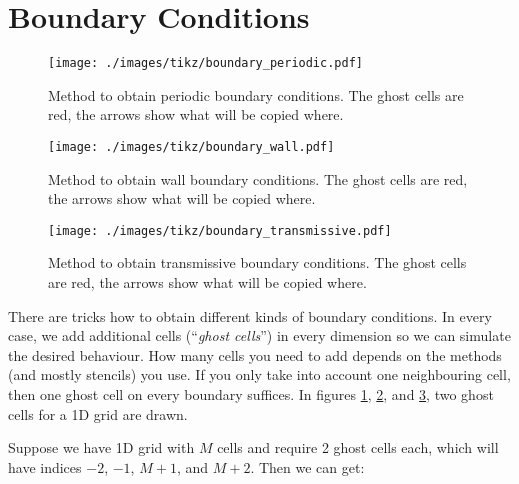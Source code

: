 \newpage
\section{Boundary Conditions}



\begin{figure}[htbp]
	\texttt{[image: ./images/tikz/boundary\_periodic.pdf]}%
	\caption{\label{fig:boundary_periodic}
		Method to obtain periodic boundary conditions.
		The ghost cells are red, the arrows show what will be copied where.
	}
\end{figure}



\begin{figure}[htbp]
	\texttt{[image: ./images/tikz/boundary\_wall.pdf]}%
	\caption{\label{fig:boundary_wall}
		Method to obtain wall boundary conditions.
		The ghost cells are red, the arrows show what will be copied where.
	}
\end{figure}



\begin{figure}[htbp]
	\texttt{[image: ./images/tikz/boundary\_transmissive.pdf]}%
	\caption{\label{fig:boundary_transmissive}
		Method to obtain transmissive boundary conditions.
		The ghost cells are red, the arrows show what will be copied where.
	}
\end{figure}



There are tricks how to obtain different kinds of boundary conditions.
In every case, we add additional cells (``\emph{ghost cells}'') in every dimension so we can simulate the desired behaviour.
How many cells you need to add depends on the methods (and mostly stencils) you use.
If you only take into account one neighbouring cell, then one ghost cell on every boundary suffices.
In figures \ref{fig:boundary_periodic}, \ref{fig:boundary_wall}, and \ref{fig:boundary_transmissive}, two ghost cells for a 1D grid are drawn.


Suppose we have 1D grid with $M$ cells and require 2 ghost cells each, which will have indices $-2$, $-1$, $M+1$, and $M+2$.
Then we can get:

